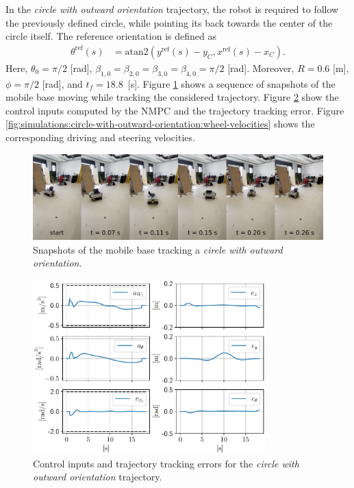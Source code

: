 In the \textit{circle with outward orientation} trajectory, the robot is required to follow the previously defined circle, while pointing its back towards the center of the circle itself. The reference orientation is defined as
\begin{subequations}
\begin{align*}
    \theta^{\mathrm{ref}}(s) &= \mathrm{atan2}(y^{\mathrm{ref}}(s) - y_C, x^{\mathrm{ref}}(s) - x_C).
\end{align*}
\end{subequations}
Here, $\theta_0=\pi/2$ [rad], $\beta_{1,0}=\beta_{2,0}=\beta_{3,0}=\beta_{4,0}=\pi/2$ [rad]. Moreover, $R=0.6$ [m], $\phi=\pi/2$ [rad], and $t_f=18.8$~[s]. Figure \ref{fig:experiments:circle-with-outward-orientation:snapshots} shows a sequence of snapshots of the mobile base moving while tracking the considered trajectory. Figure \ref{fig:simulations:circle-with-outward-orientation:inputs-and-errors} show the control inputs computed by the NMPC and the trajectory tracking error. Figure \ref{fig:simulations:circle-with-outward-orientation:wheel-velocities} shows the corresponding driving and steering velocities.
\begin{figure}
    \centering
    \includegraphics[width=\textwidth]{figures/SWMR/simulations/circular_with_outward_orientation/snapshots.jpeg}
    \caption{Snapshots of the mobile base tracking a \textit{circle with outward orientation}.}
    \label{fig:experiments:circle-with-outward-orientation:snapshots}
\end{figure}
\begin{figure}
    \centering
    \includegraphics[width=0.8\textwidth]{figures/SWMR/simulations/circular_with_outward_orientation/inputs_and_errors.pdf}
    \caption{Control inputs and trajectory tracking errors for the \textit{circle with outward orientation} trajectory.}
    \label{fig:simulations:circle-with-outward-orientation:inputs-and-errors}
\end{figure}
